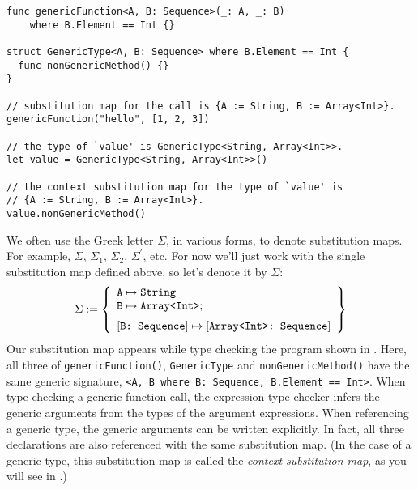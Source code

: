 \documentclass[../generics]{subfiles}
\begin{document}
\begin{listing}\label{substmaptypecheck}
\begin{Verbatim}
func genericFunction<A, B: Sequence>(_: A, _: B)
    where B.Element == Int {}

struct GenericType<A, B: Sequence> where B.Element == Int {
  func nonGenericMethod() {}
}

// substitution map for the call is {A := String, B := Array<Int>}.
genericFunction("hello", [1, 2, 3])

// the type of `value' is GenericType<String, Array<Int>>.
let value = GenericType<String, Array<Int>>()

// the context substitution map for the type of `value' is
// {A := String, B := Array<Int>}.
value.nonGenericMethod()
\end{Verbatim}
\end{listing}

\begin{example}
We often use the Greek letter $\Sigma$, in various forms, to denote substitution maps. For example, $\Sigma$, $\Sigma_1$, $\Sigma_2$, $\Sigma^\prime$, etc. For now we'll just work with the single substitution map defined above, so let's denote it by $\Sigma$:
\[
\Sigma := \SubstMapLongC{
\SubstType{A}{String}\\
\SubstType{B}{Array<Int>}
}{
\SubstConf{B}{Array<Int>}{Sequence}
}
\]
Our substitution map appears while type checking the program shown in . Here, all three of \texttt{genericFunction()}, \texttt{GenericType} and \texttt{nonGenericMethod()} have the same generic signature, \texttt{<A, B where B:~Sequence, B.Element == Int>}. When type checking a generic function call, the expression type checker infers the generic arguments from the types of the argument expressions. When referencing a generic type, the generic arguments can be written explicitly. In fact, all three declarations are also referenced with the same substitution map. (In the case of a generic type, this substitution map is called the \emph{context substitution map}, as you will see in .)
\end{example}
\end{document}
